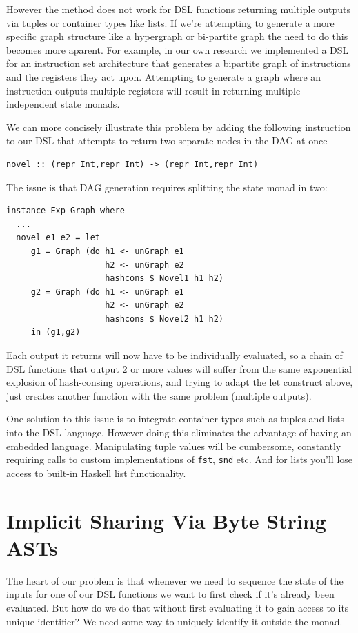 \documentclass[runningheads]{llncs}
\begin{document}
However the method does not work for DSL functions returning multiple outputs
via tuples or container types like lists. If we're attempting to generate a more
specific graph structure like a hypergraph or bi-partite graph the need to do
this becomes more aparent. For example, in our own research we implemented a DSL
for an instruction set architecture that generates a bipartite graph of
instructions and the registers they act upon. Attempting to generate a graph
where an instruction outputs multiple registers will result in returning
multiple independent state monads.

We can more concisely illustrate this problem by adding the following
instruction to our DSL that attempts to return two separate nodes in the DAG at
once
\begin{verbatim}
novel :: (repr Int,repr Int) -> (repr Int,repr Int)
\end{verbatim}

The issue is that DAG generation requires splitting the state monad in two:
\begin{verbatim}
instance Exp Graph where
  ...
  novel e1 e2 = let
     g1 = Graph (do h1 <- unGraph e1
                    h2 <- unGraph e2
                    hashcons $ Novel1 h1 h2)
     g2 = Graph (do h1 <- unGraph e1
                    h2 <- unGraph e2
                    hashcons $ Novel2 h1 h2)
     in (g1,g2)
\end{verbatim}
Each output it returns will now have to be individually evaluated, so a chain of
DSL functions that output 2 or more values will suffer from the same exponential
explosion of hash-consing operations, and trying to adapt the let construct above,
just creates another function with the same problem (multiple outputs).

One solution to this issue is to integrate container types such as tuples and
lists into the DSL language. However doing this eliminates the advantage of
having an embedded language. Manipulating tuple values will be cumbersome,
constantly requiring calls to custom implementations of
\texttt{fst}, \texttt{snd} etc. And for lists you'll
lose access to built-in Haskell list functionality.

\section{Implicit Sharing Via Byte String ASTs}

The heart of our problem is that whenever we need to sequence the state of the inputs
for one of our DSL functions we want to first check if it's already been
evaluated. But how do we do that without first evaluating it to gain access to
its unique identifier? We need some way to uniquely identify it outside the monad.
\end{document}

